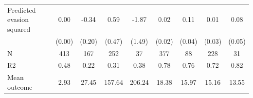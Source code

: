 \begin{tabular}{lcccc|cccc}
\addlinespace
Predicted evasion squared&        0.00\sym{*}  &       -0.34\sym{*}  &        0.59         &       -1.87         &        0.02         &        0.11\sym{***}&        0.01         &        0.08         \\
            &      (0.00)         &      (0.20)         &      (0.47)         &      (1.49)         &      (0.02)         &      (0.04)         &      (0.03)         &      (0.05)         \\
\midrule
N           &         413         &         167         &         252         &          37         &         377         &          88         &         228         &          31         \\
R2          &        0.48         &        0.22         &        0.31         &        0.38         &        0.78         &        0.76         &        0.72         &        0.82         \\
Mean outcome&        2.93         &       27.45         &      157.64         &      206.24         &       18.38         &       15.97         &       15.16         &       13.55         \\
\bottomrule \end{tabular}
